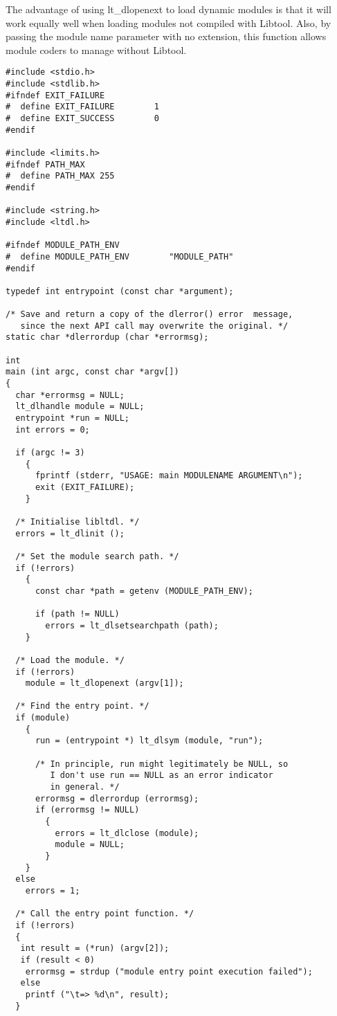 The advantage of using lt\_{}dlopenext to load dynamic modules is that it will work equally well when loading modules not compiled with Libtool. Also, by passing the module name parameter with no extension, this function allows module coders to manage without Libtool.

\begin{Verbatim}[frame=single]
#include <stdio.h>
#include <stdlib.h>
#ifndef EXIT_FAILURE
#  define EXIT_FAILURE        1
#  define EXIT_SUCCESS        0
#endif

#include <limits.h>
#ifndef PATH_MAX
#  define PATH_MAX 255
#endif

#include <string.h>
#include <ltdl.h>

#ifndef MODULE_PATH_ENV
#  define MODULE_PATH_ENV        "MODULE_PATH"
#endif

typedef int entrypoint (const char *argument);

/* Save and return a copy of the dlerror() error  message,
   since the next API call may overwrite the original. */
static char *dlerrordup (char *errormsg);

int
main (int argc, const char *argv[])
{
  char *errormsg = NULL;
  lt_dlhandle module = NULL;
  entrypoint *run = NULL;
  int errors = 0;

  if (argc != 3)
    {
      fprintf (stderr, "USAGE: main MODULENAME ARGUMENT\n");
      exit (EXIT_FAILURE);
    }

  /* Initialise libltdl. */
  errors = lt_dlinit ();

  /* Set the module search path. */
  if (!errors)
    {
      const char *path = getenv (MODULE_PATH_ENV);

      if (path != NULL)
        errors = lt_dlsetsearchpath (path);
    }
  
  /* Load the module. */
  if (!errors)
    module = lt_dlopenext (argv[1]);

  /* Find the entry point. */
  if (module)
    {
      run = (entrypoint *) lt_dlsym (module, "run");

      /* In principle, run might legitimately be NULL, so
         I don't use run == NULL as an error indicator
         in general. */
      errormsg = dlerrordup (errormsg);
      if (errormsg != NULL)
        {
          errors = lt_dlclose (module);
          module = NULL;
        }
    }
  else
    errors = 1;

  /* Call the entry point function. */
  if (!errors)
  {
   int result = (*run) (argv[2]);
   if (result < 0)
    errormsg = strdup ("module entry point execution failed");
   else
    printf ("\t=> %d\n", result);
  }


\end{Verbatim}
